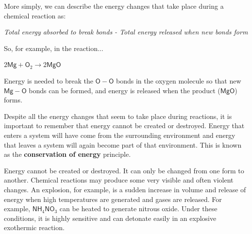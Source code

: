       \label{m38711*id64360}More simply, we can describe the energy changes that take place during a chemical reaction as:\par 
      \label{m38711*id64364}
        \textsl{Total energy absorbed to break bonds - Total energy released when new bonds form}
      \par 
      \label{m38711*id64371}So, for example, in the reaction...\par 
      \label{m38711*id64375}$2\mathsf{Mg}+{\mathsf{O}}_{2}\to 
            2\mathsf{MgO}$
      \par 
      \label{m38711*id64411}Energy is needed to break the $\mathsf{O}-\mathsf{O}$ bonds in the oxygen molecule so that new $\mathsf{Mg}-\mathsf{O}$ bonds can be formed, and energy is released when the product ($\mathsf{MgO}$) forms.\par 
      \label{m38711*id64416}Despite all the energy changes that seem to take place during reactions, it is important to remember that energy cannot be created or destroyed. Energy that enters a system will have come from the surrounding environment and energy that leaves a system will again become part of that environment. This is known as the \textbf{conservation of energy} principle.\par 
\label{m38711*fhsst!!!underscore!!!id409}
 { \label{m38711*meaningfhsst!!!underscore!!!id409}
      Energy cannot be created or destroyed. It can only be changed from one form to another. 
       } 
      \label{m38711*id64445}Chemical reactions may produce some very visible and often violent changes. An explosion, for example, is a sudden increase in volume and release of energy when high temperatures are generated and gases are released. For example, $\mathsf{NH}{}_{4}{\mathsf{NO}}_{3}$ can be heated to generate nitrous oxide. Under these conditions, it is highly sensitive and can detonate easily in an explosive exothermic reaction.\par 
    \label{m38711*cid5}
